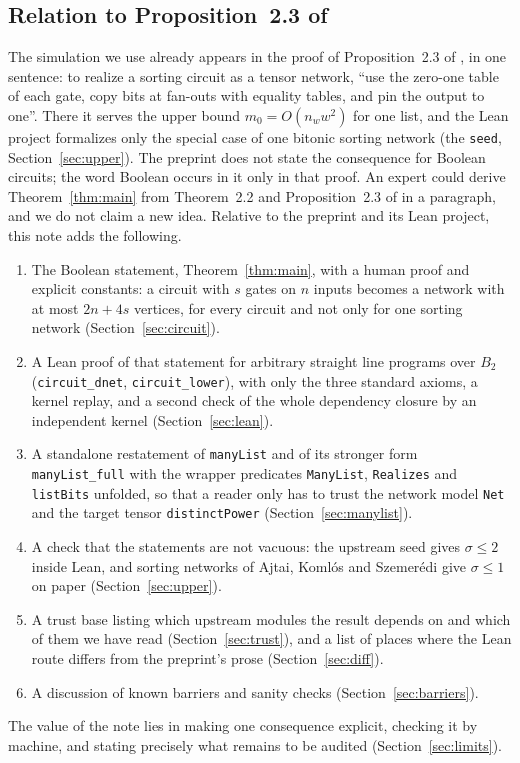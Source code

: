 \documentclass[11pt]{amsart}
\theoremstyle{definition}
\theoremstyle{remark}
\newcommand{\lean}[1]{\texttt{#1}}
\begin{document}
\subsection{Relation to Proposition~2.3 of \cite{OAI94}}\label{sec:prop23}
The simulation we use already appears in the proof of Proposition~2.3 of \cite{OAI94}, in one sentence: to realize a sorting circuit as a tensor network, ``use the zero-one table of each gate, copy bits at fan-outs with equality tables, and pin the output to one''. There it serves the upper bound $m_0=O(n_w w^2)$ for one list, and the Lean project formalizes only the special case of one bitonic sorting network (the \lean{seed}, Section~\ref{sec:upper}). The preprint does not state the consequence for Boolean circuits; the word Boolean occurs in it only in that proof. An expert could derive Theorem~\ref{thm:main} from Theorem~2.2 and Proposition~2.3 of \cite{OAI94} in a paragraph, and we do not claim a new idea. Relative to the preprint and its Lean project, this note adds the following.
\begin{enumerate}
\item The Boolean statement, Theorem~\ref{thm:main}, with a human proof and explicit constants: a circuit with $s$ gates on $n$ inputs becomes a network with at most $2n+4s$ vertices, for every circuit and not only for one sorting network (Section~\ref{sec:circuit}).
\item A Lean proof of that statement for arbitrary straight line programs over $B_2$ (\lean{circuit\_dnet}, \lean{circuit\_lower}), with only the three standard axioms, a kernel replay, and a second check of the whole dependency closure by an independent kernel (Section~\ref{sec:lean}).
\item A standalone restatement of \lean{manyList} and of its stronger form \lean{manyList\_full} with the wrapper predicates \lean{ManyList}, \lean{Realizes} and \lean{listBits} unfolded, so that a reader only has to trust the network model \lean{Net} and the target tensor \lean{distinctPower} (Section~\ref{sec:manylist}).
\item A check that the statements are not vacuous: the upstream seed gives $\sigma\le 2$ inside Lean, and sorting networks of Ajtai, Koml\'os and Szemer\'edi give $\sigma\le 1$ on paper (Section~\ref{sec:upper}).
\item A trust base listing which upstream modules the result depends on and which of them we have read (Section~\ref{sec:trust}), and a list of places where the Lean route differs from the preprint's prose (Section~\ref{sec:diff}).
\item A discussion of known barriers and sanity checks (Section~\ref{sec:barriers}).
\end{enumerate}
The value of the note lies in making one consequence explicit, checking it by machine, and stating precisely what remains to be audited (Section~\ref{sec:limits}).
\end{document}
